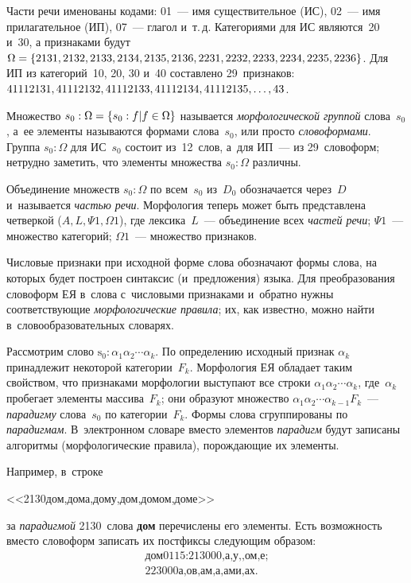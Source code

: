 \begin{multicols}{2}
    Части речи именованы кодами: 01~--- имя существительное (ИС), 02~--- 
имя прилагательное (ИП), 07~--- глагол и~т.\,д. Категориями для ИС 
являются~20 и~30, а признаками будут $\Omega\hm = \{2131, 2132, 2133, 
2134, 2135, 2136, 2231, 2232,\linebreak
 2233, 2234, 2235, 2236\}$. Для ИП из 
категорий~10, 20, 30 и~40 составлено 29~признаков: $41112131,\linebreak 41112132, 
41112133, 41112134, 41112135, \ldots, 43$. 
    
    Множество ${s}_0:\Omega\hm = \{{s}_0:f \vert  f\hm\in 
\Omega\}$ называется \textit{морфологической группой} 
слова~${s}_0$, а~ее элементы называются формами 
слова~${s}_0$, или просто \textit{словоформами}. Группа 
${s}_0:\Omega$ для ИС~$s_0$ состоит из~12~слов, а~для ИП~--- из 
29~словоформ; нетрудно заметить, что элементы множества 
${s}_0:\Omega$ различны. 
    
    Объединение множеств ${s}_0:\Omega$ по всем~$s_0$ 
из~$D_0$ обозначается через~$D$ и~называется \textit{частью речи}. 
Морфология теперь может быть представлена чет\-вер\-кой ($A, L, \Psi1, 
\Omega1$), где лексика~$L$~--- объединение всех \textit{частей речи}; 
$\Psi1$~--- множество категорий; $\Omega1$~--- множество признаков.
    
    Числовые признаки при исходной форме слова обозначают формы слова, 
на которых будет построен синтаксис (и~предложения) языка. Для 
преобразования словоформ ЕЯ в~слова с~числовыми признаками и~обратно 
нужны соответствующие \textit{морфологические правила}; их, как известно, 
можно найти в~словообразовательных словарях.
    
     Рассмотрим слово $\mathrm{s}_0:\alpha_1\alpha_2\cdots \alpha_k$. По 
определению исходный признак $\alpha_k$ принадлежит некоторой 
категории~$F_k$. Морфология ЕЯ обладает таким свойством, что 
признаками морфологии выступают все строки $\alpha_1\alpha_2\cdots \alpha_k$, 
где~$\alpha_k$ пробегает элементы массива~$F_k$; они образуют множество 
$\alpha_1\alpha_2\cdots \alpha_{k-1}F_k$~--- \textit{парадигму} слова~${s}_0$ по 
категории~$F_k$. Формы слова сгруппированы по \textit{парадигмам}. 
В~электронном словаре вместо элементов \textit{парадигм} будут записаны 
алгоритмы (морфологические правила), порождающие их элементы.
     
     Например, в~строке 
     
     <<2130дом,дома,дому,дом,домом,доме>> 
     
     \noindent
     за 
\textit{парадигмой} 2130~слова \textbf{дом} перечислены его элементы. Есть 
возможность вместо словоформ записать их постфиксы следующим образом:
     \begin{multline}
      \mbox{дом0115:213000,а,у,,ом,е;}\\
      \mbox{223000а,ов,ам,а,ами,ах}.
      \label{e1-shi}
      \end{multline}
      

\end{multicols}
